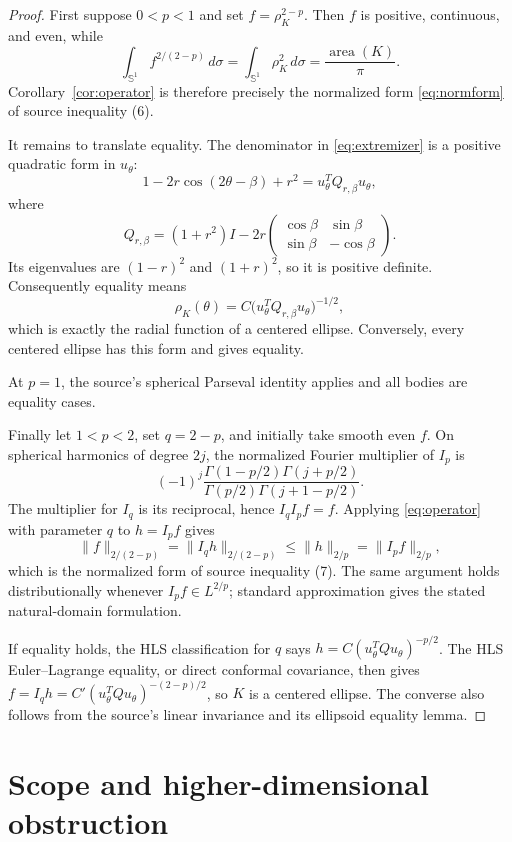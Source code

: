 \documentclass[10pt]{article}
\newcommand{\Sph}{\mathbb S}
\begin{document}
\begin{proof}
First suppose $0<p<1$ and set $f=\rho_K^{2-p}$.  Then $f$ is positive,
continuous, and even, while
\[
 \int_{\Sph^1} f^{2/(2-p)}\,d\sigma
 =\int_{\Sph^1}\rho_K^2\,d\sigma
 =\frac{\operatorname{area}(K)}{\pi}.
\]
Corollary~\ref{cor:operator} is therefore precisely the normalized form
\eqref{eq:normform} of source inequality (6).

It remains to translate equality.  The denominator in
\eqref{eq:extremizer} is a positive quadratic form in $u_\theta$:
\[
 1-2r\cos(2\theta-\beta)+r^2
 =u_\theta^TQ_{r,\beta}u_\theta,
\]
where
\[
 Q_{r,\beta}=(1+r^2)I-2r
 \begin{pmatrix}\cos\beta&\sin\beta\\
                 \sin\beta&-\cos\beta\end{pmatrix}.
\]
Its eigenvalues are $(1-r)^2$ and $(1+r)^2$, so it is positive definite.
Consequently equality means
\[
 \rho_K(\theta)=C\bigl(u_\theta^TQ_{r,\beta}u_\theta\bigr)^{-1/2},
\]
which is exactly the radial function of a centered ellipse.  Conversely,
every centered ellipse has this form and gives equality.

At $p=1$, the source's spherical Parseval identity applies and all bodies
are equality cases.

Finally let $1<p<2$, set $q=2-p$, and initially take smooth even $f$.  On
spherical harmonics of degree $2j$, the normalized Fourier multiplier of
$I_p$ is
\[
 (-1)^j\frac{\Gamma(1-p/2)\Gamma(j+p/2)}
 {\Gamma(p/2)\Gamma(j+1-p/2)}.
\]
The multiplier for $I_q$ is its reciprocal, hence $I_qI_p f=f$.  Applying
\eqref{eq:operator} with parameter $q$ to $h=I_pf$ gives
\[
 \|f\|_{2/(2-p)}=\|I_qh\|_{2/(2-p)}
 \leq\|h\|_{2/p}=\|I_pf\|_{2/p},
\]
which is the normalized form of source inequality (7).  The same argument
holds distributionally whenever $I_pf\in L^{2/p}$; standard approximation
gives the stated natural-domain formulation.

If equality holds, the HLS classification for $q$ says
$h=C(u_\theta^TQu_\theta)^{-p/2}$.  The HLS Euler--Lagrange equality, or
direct conformal covariance, then gives
$f=I_qh=C'(u_\theta^TQu_\theta)^{-(2-p)/2}$, so $K$ is a centered ellipse.
The converse also follows from the source's linear invariance and its
ellipsoid equality lemma.
\end{proof}

\section{Scope and higher-dimensional obstruction}
\end{document}
